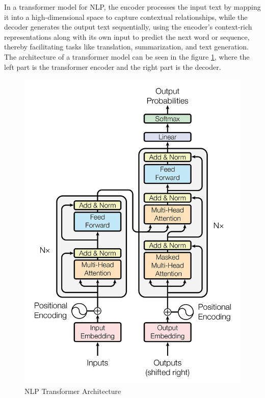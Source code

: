 In a transformer model for NLP, the encoder processes the input text by mapping it into a high-dimensional space to capture contextual relationships, while the 
decoder generates the output text sequentially, using the encoder's context-rich representations along with its own input to predict the next word or 
sequence, thereby facilitating tasks like translation, summarization, and text generation. The architecture of a transformer model can be seen in the 
figure \ref{fig:tr-base}, where the left part is the transformer encoder and the right part is the decoder.


\begin{figure}[h!]
    \centering
    \includegraphics[scale=0.2]{Figures/transformer_basis.jpg}
    \caption{NLP Transformer Architecture}
    \label{fig:tr-base}
\end{figure}

